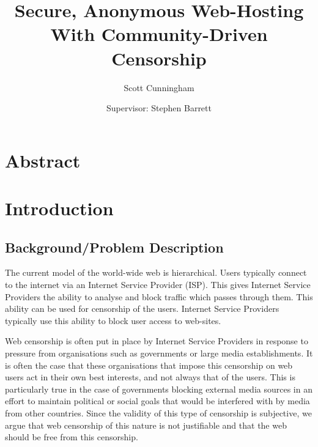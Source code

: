 \documentclass{article}
\title{Secure, Anonymous Web-Hosting With Community-Driven Censorship}
\begin{document}
\author{Scott Cunningham}
\date{Supervisor: Stephen Barrett}

\maketitle{}


\newpage{}

\tableofcontents{}

\newpage{}

\section*{Abstract}

\newpage{}
\section{Introduction}
%
\subsection{Background/Problem Description}

The current model of the world-wide web is hierarchical. Users typically connect to the internet via an Internet Service Provider (ISP). This gives Internet Service Providers the ability to analyse and block traffic which passes through them. This ability can be used for censorship of the users. Internet Service Providers typically use this ability to block user access to web-sites.

Web censorship is often put in place by Internet Service Providers in response to pressure from organisations such as governments or large media establishments. It is often the case that these organisations that impose this censorship on web users act in their own best interests, and not always that of the users. This is particularly true in the case of governments blocking external media sources in an effort to maintain political or social goals that would be interfered with by media from other countries. Since the validity of this type of censorship is subjective, we argue that web censorship of this nature is not justifiable and that the web should be free from this censorship.
\end{document}

